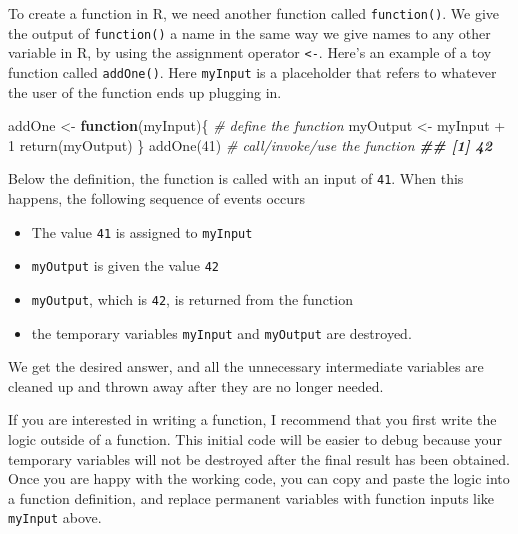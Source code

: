 \documentclass[
  12pt,
  krantz2]{krantz}
\makeatletter
\newenvironment{Shaded}{\begin{snugshade}}{\end{snugshade}}
\newcommand{\CommentTok}[1]{\textcolor[rgb]{0.37,0.37,0.37}{\textit{#1}}}
\newcommand{\ControlFlowTok}[1]{\textcolor[rgb]{0.27,0.27,0.27}{\textbf{#1}}}
\newcommand{\DecValTok}[1]{\textcolor[rgb]{0.06,0.06,0.06}{#1}}
\newcommand{\DocumentationTok}[1]{\textcolor[rgb]{0.37,0.37,0.37}{\textbf{\textit{#1}}}}
\newcommand{\FunctionTok}[1]{\textcolor[rgb]{0,0,0}{#1}}
\newcommand{\NormalTok}[1]{#1}
\newcommand{\OtherTok}[1]{\textcolor[rgb]{0.37,0.37,0.37}{#1}}
\newcommand{\SpecialCharTok}[1]{\textcolor[rgb]{0,0,0}{#1}}
\providecommand{\tightlist}{%
  \setlength{\itemsep}{0pt}\setlength{\parskip}{0pt}}
\newenvironment{kframe}{%
\medskip{}
\setlength{\fboxsep}{.8em}
 \def\at@end@of@kframe{}%
 \ifinner\ifhmode%
  \def\at@end@of@kframe{\end{minipage}}%
  \begin{minipage}{\columnwidth}%
 \fi\fi%
 \def\FrameCommand##1{\hskip\@totalleftmargin \hskip-\fboxsep
 \colorbox{shadecolor}{##1}\hskip-\fboxsep
     \hskip-\linewidth \hskip-\@totalleftmargin \hskip\columnwidth}%
 \MakeFramed {\advance\hsize-\width
   \@totalleftmargin\z@ \linewidth\hsize
   \@setminipage}}%
 {\par\unskip\endMakeFramed%
 \at@end@of@kframe}
\renewenvironment{Shaded}{\begin{kframe}}{\end{kframe}}
\newenvironment{rmd-caution}{\begin{lrbox}{\rmdbox}
  \minipage[c]{\dimexpr \textwidth-2\fboxrule-\wd\excl-\columnsep}
    \vspace*{\columnsep}}%
{\vspace*{\columnsep}\endminipage\end{lrbox}%
  {\par\color{yellow}\fboxsep=0pt
    \fbox{\usebox\excl\usebox\rmdbox\hspace{\columnsep}}\par}}
\makeatother
\begin{document}
To create a function in R, we need another function called \texttt{function()}. We give the output of \texttt{function()} a name in the same way we give names to any other variable in R, by using the assignment operator \texttt{\textless{}-}. Here's an example of a toy function called \texttt{addOne()}. Here \texttt{myInput} is a placeholder that refers to whatever the user of the function ends up plugging in.

\begin{Shaded}
\begin{Highlighting}[]
\NormalTok{addOne }\OtherTok{\textless{}{-}} \ControlFlowTok{function}\NormalTok{(myInput)\{  }\CommentTok{\# define the function}
\NormalTok{  myOutput }\OtherTok{\textless{}{-}}\NormalTok{ myInput }\SpecialCharTok{+} \DecValTok{1}
  \FunctionTok{return}\NormalTok{(myOutput)}
\NormalTok{\}}
\FunctionTok{addOne}\NormalTok{(}\DecValTok{41}\NormalTok{) }\CommentTok{\# call/invoke/use the function }
\DocumentationTok{\#\# [1] 42}
\end{Highlighting}
\end{Shaded}

Below the definition, the function is called with an input of \texttt{41}. When this happens, the following sequence of events occurs

\begin{itemize}
\tightlist
\item
  The value \texttt{41} is assigned to \texttt{myInput}
\item
  \texttt{myOutput} is given the value \texttt{42}
\item
  \texttt{myOutput}, which is \texttt{42}, is returned from the function
\item
  the temporary variables \texttt{myInput} and \texttt{myOutput} are destroyed.
\end{itemize}

We get the desired answer, and all the unnecessary intermediate variables are cleaned up and thrown away after they are no longer needed.

\begin{rmd-caution}
If you are interested in writing a function, I recommend that you first write the logic outside of a function. This initial code will be easier to debug because your temporary variables will not be destroyed after the final result has been obtained. Once you are happy with the working code, you can copy and paste the logic into a function definition, and replace permanent variables with function inputs like \texttt{myInput} above.

\end{rmd-caution}
\end{document}
